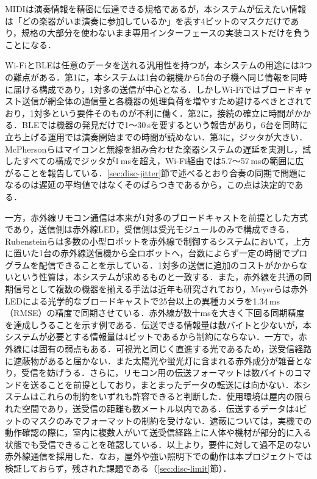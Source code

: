 \documentclass[uplatex,dvipdfmx]{jlreq}
\begin{document}
MIDIは演奏情報を精密に伝達できる規格であるが，本システムが伝えたい情報は「どの楽器がいま演奏に参加しているか」を表す4ビットのマスクだけであり，規格の大部分を使わないまま専用インターフェースの実装コストだけを負うことになる．

Wi-FiとBLEは任意のデータを送れる汎用性を持つが，本システムの用途には3つの難点がある．第1に，本システムは1台の親機から5台の子機へ同じ情報を同時に届ける構成であり，1対多の送信が中心となる．しかしWi-Fiではブロードキャスト送信が網全体の通信量と各機器の処理負荷を増やすため避けるべきとされており\cite{mitchell2014}，1対多という要件そのものが不利に働く．第2に，接続の確立に時間がかかる．BLEでは機器の発見だけで1〜30\,sを要するという報告があり\cite{tosi2017}，6台を同時に立ち上げる運用では演奏開始までの時間が読めない．第3に，ジッタが大きい．McPhersonらはマイコンと無線を組み合わせた楽器システムの遅延を実測し，試したすべての構成でジッタが1\,msを超え，Wi-Fi経由では5.7〜57\,msの範囲に広がることを報告している\cite{mcpherson2016}．\ref{sec:disc-jitter}節で述べるとおり合奏の同期で問題になるのは遅延の平均値ではなくそのばらつきであるから，この点は決定的である．

一方，赤外線リモコン通信は本来が1対多のブロードキャストを前提とした方式であり，送信側は赤外線LED，受信側は受光モジュールのみで構成できる．Rubensteinらは多数の小型ロボットを赤外線で制御するシステムにおいて，上方に置いた1台の赤外線送信機から全ロボットへ，台数によらず一定の時間でプログラムを配信できることを示している\cite{rubenstein2012}．1対多の送信に追加のコストがかからないという性質は，本システムが求めるものと一致する．また，赤外線を共通の同期信号として複数の機器を揃える手法は近年も研究されており，Meyerらは赤外LEDによる光学的なブロードキャストで25台以上の異種カメラを1.34\,ms（RMSE）の精度で同期させている\cite{meyer2026}．赤外線が数十msを大きく下回る同期精度を達成しうることを示す例である．伝送できる情報量は数バイトと少ないが，本システムが必要とする情報量は4ビットであるから制約にならない．一方で，赤外線には固有の弱点もある．可視光と同じく直進する光であるため，送受信経路に遮蔽物があると届かない．また太陽光や蛍光灯に含まれる赤外成分が雑音となり，受信を妨げうる．さらに，リモコン用の伝送フォーマットは数バイトのコマンドを送ることを前提としており，まとまったデータの転送には向かない．本システムはこれらの制約をいずれも許容できると判断した．使用環境は屋内の限られた空間であり，送受信の距離も数メートル以内である．伝送するデータは4ビットのマスクのみでフォーマットの制約を受けない．遮蔽については，実機での動作確認の際に，室内に複数人がいて送受信経路上に人体や機材が部分的に入る状態でも受信できることを確認している．以上より，要件に対して過不足のない赤外線通信を採用した．なお，屋外や強い照明下での動作は本プロジェクトでは検証しておらず，残された課題である（\ref{sec:disc-limit}節）．
\end{document}
